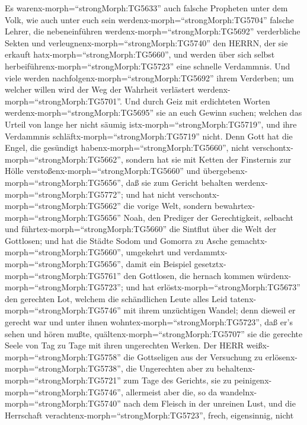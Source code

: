  Es warenx-morph=``strongMorph:TG5633'' auch falsche
Propheten unter dem Volk, wie auch unter euch sein
werdenx-morph=``strongMorph:TG5704'' falsche Lehrer, die nebeneinführen
werdenx-morph=``strongMorph:TG5692'' verderbliche Sekten und
verleugnenx-morph=``strongMorph:TG5740'' den HERRN, der sie erkauft
hatx-morph=``strongMorph:TG5660'', und werden über sich selbst
herbeiführenx-morph=``strongMorph:TG5723'' eine schnelle Verdammnis.
 Und viele werden nachfolgenx-morph=``strongMorph:TG5692''
ihrem Verderben; um welcher willen wird der Weg der Wahrheit verlästert
werdenx-morph=``strongMorph:TG5701''.  Und durch Geiz mit
erdichteten Worten werdenx-morph=``strongMorph:TG5695'' sie an euch
Gewinn suchen; welchen das Urteil von lange her nicht säumig
istx-morph=``strongMorph:TG5719'', und ihre Verdammnis
schläftx-morph=``strongMorph:TG5719'' nicht.  Denn Gott hat
die Engel, die gesündigt habenx-morph=``strongMorph:TG5660'', nicht
verschontx-morph=``strongMorph:TG5662'', sondern hat sie mit Ketten der
Finsternis zur Hölle verstoßenx-morph=``strongMorph:TG5660'' und
übergebenx-morph=``strongMorph:TG5656'', daß sie zum Gericht behalten
werdenx-morph=``strongMorph:TG5772'';  und hat nicht
verschontx-morph=``strongMorph:TG5662'' die vorige Welt, sondern
bewahrtex-morph=``strongMorph:TG5656'' Noah, den Prediger der
Gerechtigkeit, selbacht und führtex-morph=``strongMorph:TG5660'' die
Sintflut über die Welt der Gottlosen;  und hat die Städte
Sodom und Gomorra zu Asche gemachtx-morph=``strongMorph:TG5660'',
umgekehrt und verdammtx-morph=``strongMorph:TG5656'', damit ein Beispiel
gesetztx-morph=``strongMorph:TG5761'' den Gottlosen, die hernach kommen
würdenx-morph=``strongMorph:TG5723'';  und hat
erlöstx-morph=``strongMorph:TG5673'' den gerechten Lot, welchem die
schändlichen Leute alles Leid tatenx-morph=``strongMorph:TG5746'' mit
ihrem unzüchtigen Wandel;  denn dieweil er gerecht war und
unter ihnen wohntex-morph=``strongMorph:TG5723'', daß er's sehen und
hören mußte, quältenx-morph=``strongMorph:TG5707'' sie die gerechte
Seele von Tag zu Tage mit ihren ungerechten Werken.  Der
HERR weißx-morph=``strongMorph:TG5758'' die Gottseligen aus der
Versuchung zu erlösenx-morph=``strongMorph:TG5738'', die Ungerechten
aber zu behaltenx-morph=``strongMorph:TG5721'' zum Tage des Gerichts,
sie zu peinigenx-morph=``strongMorph:TG5746'',  allermeist
aber die, so da wandelnx-morph=``strongMorph:TG5740'' nach dem Fleisch
in der unreinen Lust, und die Herrschaft
verachtenx-morph=``strongMorph:TG5723'', frech, eigensinnig, nicht
